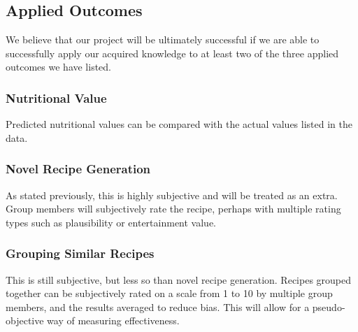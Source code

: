 \documentclass[sigconf]{acmart}
\begin{document}


\subsection{Applied Outcomes}
We believe that our project will be ultimately successful if we are able to successfully apply our acquired knowledge to at least two of the three applied outcomes we have listed.

\subsubsection{Nutritional Value}
Predicted nutritional values can be compared with the actual values listed in the data.

\subsubsection{Novel Recipe Generation}
As stated previously, this is highly subjective and will be treated as an extra. Group members will subjectively rate the recipe, perhaps with multiple rating types such as plausibility or entertainment value.

\subsubsection{Grouping Similar Recipes}
This is still subjective, but less so than novel recipe generation. Recipes grouped together can be subjectively rated on a scale from 1 to 10 by multiple group members, and the results averaged to reduce bias. This will allow for a pseudo-objective way of measuring effectiveness.
\end{document}
